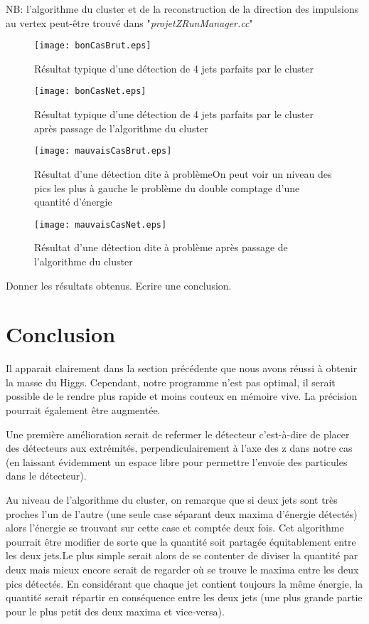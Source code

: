 \documentclass[11pt]{article}
\begin{document}
NB: l'algorithme du cluster et de la reconstruction de la direction des
impulsions au vertex peut-être trouvé dans "\textit{projetZRunManager.cc}"

\begin{figure}
\caption{Résultat typique d'une détection de 4 jets parfaits par le cluster}
\texttt{[image: bonCasBrut.eps]}
\end{figure}
\begin{figure}
\caption{Résultat typique d'une détection de 4 jets parfaits par le cluster après passage de l'algorithme du cluster}
\texttt{[image: bonCasNet.eps]}
\end{figure}
\begin{figure}
\caption{Résultat d'une détection dite à problème\newline On peut voir un niveau des pics les plus à gauche le problème du double comptage d'une quantité d'énergie}
\texttt{[image: mauvaisCasBrut.eps]}
\end{figure}
\begin{figure}
\caption{Résultat  d'une détection dite à problème après passage de l'algorithme du cluster}
\texttt{[image: mauvaisCasNet.eps]}
\end{figure}

Donner les résultats obtenus.
Ecrire une conclusion.

\section{Conclusion}
 Il apparait clairement dans la section pr\'ec\'edente que nous avons r\'eussi \`a obtenir la masse du Higgs.
Cependant, notre programme n'est pas optimal, il serait possible de le rendre plus rapide et 
moins couteux en m\'emoire vive. La pr\'ecision pourrait \'egalement être augment\'ee. 

Une première amélioration serait de refermer le d\'etecteur c'est-à-dire de placer des d\'etecteurs aux extrémités, 
perpendiculairement à l'axe des z dans notre cas (en laissant évidemment un espace libre pour permettre l'envoie des 
particules dans le d\'etecteur). 

Au niveau de l'algorithme du cluster, on remarque que si deux jets sont très proches l'un de l'autre (une seule case 
s\'eparant deux maxima d'énergie détectés) alors l'énergie se trouvant sur cette case et comptée deux fois. Cet algorithme
 pourrait être modifier de sorte que la quantité soit partagée équitablement entre les deux jets.Le plus simple serait
alors de se contenter de diviser la quantité par deux mais mieux encore serait de regarder où se trouve le 
maxima entre les deux pics détectés. En considérant que chaque jet contient toujours la même énergie, la quantité serait
répartir en conséquence entre les deux jets (une plus grande partie pour le plus petit des deux maxima et vice-versa).
\end{document}
